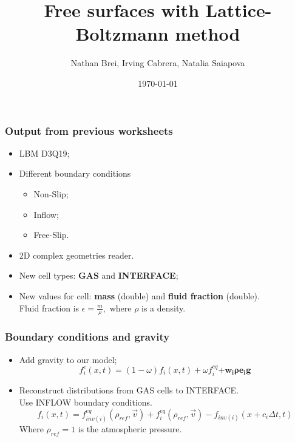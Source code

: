 \documentclass[10pt,a4paper]{beamer}
\author{ Nathan Brei, Irving Cabrera, Natalia Saiapova}
\institute[TUM]{TU München}
\date{\today}
\title{Free surfaces with Lattice-Boltzmann method}
\begin{document}
\begin{frame}
	\maketitle
\end{frame}
\begin{frame}
	\frametitle{Output from previous worksheets}
	\begin{itemize}
	\item LBM D3Q19;
	\item Different boundary conditions
		\begin{itemize}
		\item Non-Slip;  
		\item Inflow;
		\item Free-Slip.
		\end{itemize}
	\item 2D complex geometries reader.
	\end{itemize}
\end{frame}

\begin{frame}
  \begin{itemize}
    \frametitle{New values}
  \item New cell types: \textbf{GAS} and \textbf{INTERFACE};
  \item New values for cell: \textbf{mass} (double) and \textbf{fluid fraction} (double).\\
    Fluid fraction is
    \(
    \epsilon = \frac{m}{\rho},
    \)
    where $\rho$ is a density.
  \end{itemize}
\end{frame}
\begin{frame}
  \frametitle{Boundary conditions and gravity}
  \begin{itemize}
  \item Add gravity to our model;
  $$ f^c_i (x, t) = (1 - \omega)f_i (x, t) + \omega f_i ^{eq} \mathbf{ + w_ i \rho e_i g }$$
  \item Reconstruct distributions from GAS cells to INTERFACE.\\
    Use INFLOW boundary conditions.
    $$f_i (x,t) = f ^{eq} _{inv(i)} (\rho _{ref} ,\overrightarrow{v} ) + f ^{eq} _ i (\rho _{ref} ,\overrightarrow{v} ) - f _{inv(i)} (x + c_i \Delta t, t)$$
    Where $\rho _{ref} = 1 $ is the  atmospheric pressure.
  \end{itemize}
\end{frame}
\end{document}
